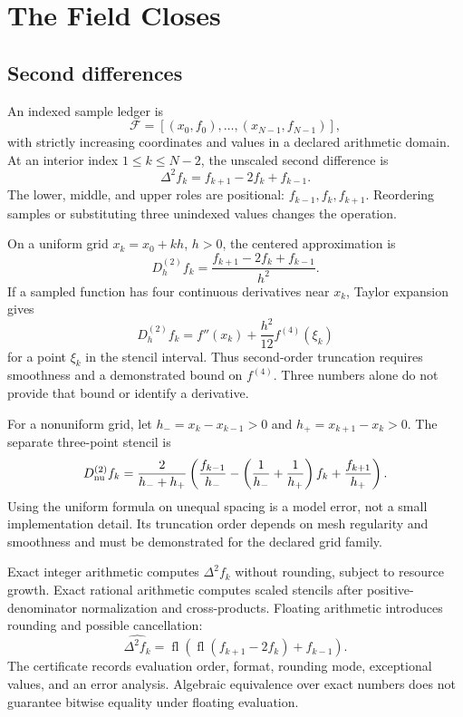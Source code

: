 \chapter{The Field Closes}

\section{Second differences}

An indexed sample ledger is
\[
\mathcal F=[(x_0,f_0),\ldots,(x_{N-1},f_{N-1})],
\]
with strictly increasing coordinates and values in a declared arithmetic domain.  At an interior index
\(1\leq k\leq N-2\), the unscaled second difference is
\[
                         \Delta^2f_k=f_{k+1}-2f_k+f_{k-1}.
\]
The lower, middle, and upper roles are positional: \(f_{k-1},f_k,f_{k+1}\).  Reordering samples or substituting three
unindexed values changes the operation.

On a uniform grid \(x_k=x_0+kh\), \(h>0\), the centered approximation is
\[
                         D^{(2)}_hf_k=\frac{f_{k+1}-2f_k+f_{k-1}}{h^2}.
\]
If a sampled function has four continuous derivatives near \(x_k\), Taylor expansion gives
\[
 D^{(2)}_hf_k=f''(x_k)+\frac{h^2}{12}f^{(4)}(\xi_k)
\]
for a point \(\xi_k\) in the stencil interval.  Thus second-order truncation requires smoothness and a demonstrated
bound on \(f^{(4)}\).  Three numbers alone do not provide that bound or identify a derivative.

For a nonuniform grid, let \(h_-=x_k-x_{k-1}>0\) and \(h_+=x_{k+1}-x_k>0\).  The separate three-point stencil is
\[
D^{(2)}_{\rm nu}f_k=
\frac{2}{h_-+h_+}
\left(\frac{f_{k-1}}{h_-}
-\left(\frac1{h_-}+\frac1{h_+}\right)f_k
+\frac{f_{k+1}}{h_+}\right).
\]
Using the uniform formula on unequal spacing is a model error, not a small implementation detail.  Its truncation
order depends on mesh regularity and smoothness and must be demonstrated for the declared grid family.

Exact integer arithmetic computes \(\Delta^2f_k\) without rounding, subject to resource growth.  Exact rational
arithmetic computes scaled stencils after positive-denominator normalization and cross-products.  Floating arithmetic
introduces rounding and possible cancellation:
\[
\widehat{\Delta^2f_k}
=\operatorname{fl}\!\left(\operatorname{fl}(f_{k+1}-2f_k)+f_{k-1}\right).
\]
The certificate records evaluation order, format, rounding mode, exceptional values, and an error analysis.  Algebraic
equivalence over exact numbers does not guarantee bitwise equality under floating evaluation.

